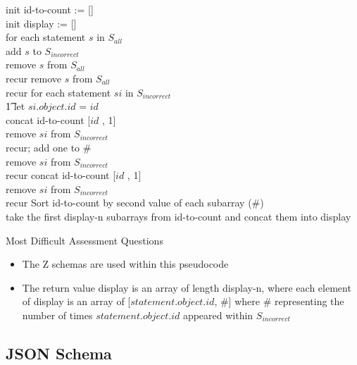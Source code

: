 \documentclass{article}
\begin{document}
\begin{algorithm}[H]

  \SetAlgoLined

  init id-to-count := [] \\
  init display := [] \\
   {
    for each statement $s$ in $S_{all}$ \\
    {
      add $s$ to $S_{incorrect}$ \\
      remove $s$ from $S_{all}$ \\
      recur
    }
    {
      remove $s$ from $S_{all}$ \\
      recur
    }}
   {
    for {each statement $si$ in $S_{incorrect}$} \\
    \t1 let $si.object.id$ = $id$ \\
    { concat id-to-count [$id$ , 1] \\
      remove $si$ from $S_{incorrect}$\\
      recur;}
    {
      { add one to \# \\
        remove $si$ from $S_{incorrect}$ \\
        recur}
    { concat id-to-count [$id$ , 1] \\
      remove $si$ from $S_{incorrect}$\\
      recur}
    }
  }
  Sort id-to-count by second value of each subarray (\#) \\
  take the first display-n subarrays from id-to-count and concat them into display
  \caption{Most Difficult Assessment Questions}
\end{algorithm}
\begin{itemize}
\item The Z schemas are used within this pseudocode
\item The return value display is an array of length display-n, where
  each element of display is an array of [$statement.object.id$, \#]
   where $\#$ representing the number of times $statement.object.id$
   appeared within $S_{incorrect}$
\end{itemize}

\subsection{JSON Schema}
\end{document}
